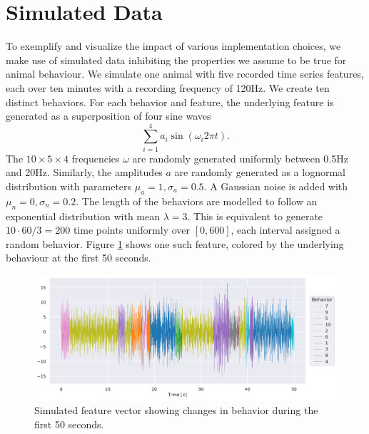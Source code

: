 \documentclass[a4paper, 10pt]{memoir}
\theoremstyle{plain}
\theoremstyle{definition}
\theoremstyle{remark}
\begin{document}
\section{Simulated Data}
To exemplify and visualize the impact of various implementation choices, we make use of simulated data inhibiting the properties we assume to be true for animal behaviour.
We simulate one animal with five recorded time series features, each over ten minutes with a recording frequency of 120Hz.
We create ten distinct behaviors.
For each behavior and feature, the underlying feature is generated as a superposition of four sine waves
\begin{equation*}
        \sum_{i = 1}^{4} a_i \sin (\omega_i 2 \pi t).
\end{equation*}
The $10 \times 5 \times 4$ frequencies $\omega$ are randomly generated uniformly between 0.5Hz and 20Hz.
Similarly, the amplitudes $a$ are randomly generated as a lognormal distribution with parameters $\mu_a = 1, \sigma_a = 0.5$.
A Gaussian noise is added with $\mu_n = 0, \sigma_n = 0.2$.
The length of the behaviors are modelled to follow an exponential distribution with mean $\lambda = 3$.
This is equivalent to generate $10 \cdot 60 / 3 = 200$ time points uniformly over $[0, 600]$, each interval assigned a random behavior.
Figure \ref{fig:color_coded_feature_1} shows one such feature, colored by the underlying behaviour at the first 50 seconds.


\begin{figure}[tb]
        \centering
        \includegraphics[width=1\linewidth]{./code/figures/simulated/features/color_coded_feature_1.pdf}
        \caption{Simulated feature vector showing changes in behavior during the first 50 seconds.}
        \label{fig:color_coded_feature_1}
\end{figure}
\end{document}
